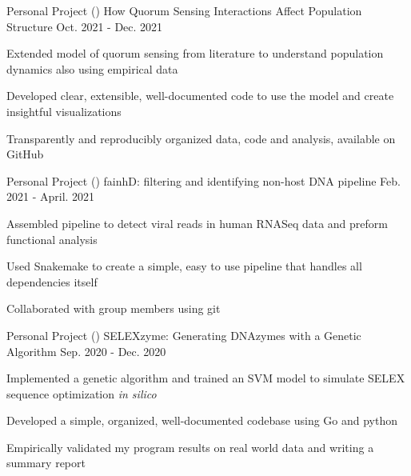 \begin{cventries}
\cventry
{Personal Project ()}
{How Quorum Sensing Interactions Affect Population Structure}
{Oct. 2021 - Dec. 2021}
{}
{
\begin{cvitems}
    \item{Extended model of quorum sensing from literature to understand population dynamics also using empirical data}
    \item{Developed clear, extensible, well-documented code to use the model and create insightful visualizations}
    \item{Transparently and reproducibly organized data, code and analysis, available on GitHub}
\end{cvitems}
}
\cventry
{Personal Project ()}
{fainhD: filtering and identifying non-host DNA pipeline}
{Feb. 2021 - April. 2021}
{}
{
\begin{cvitems}
    \item{Assembled pipeline to detect viral reads in human RNASeq data and preform functional analysis}
    \item{Used Snakemake to create a simple, easy to use pipeline that handles all dependencies itself}
    \item{Collaborated with group members using git}
\end{cvitems}
}
\cventry
{Personal Project ()}
{SELEXzyme: Generating DNAzymes with a Genetic Algorithm}
{Sep. 2020 - Dec. 2020}
{}
{
\begin{cvitems}
    \item{Implemented a genetic algorithm and trained an SVM model to simulate SELEX sequence optimization \textit{in silico}}
    \item{Developed a simple, organized, well-documented codebase using Go and python}
    \item{Empirically validated my program results on real world data and writing a summary report}
\end{cvitems}
}
\end{cventries}
